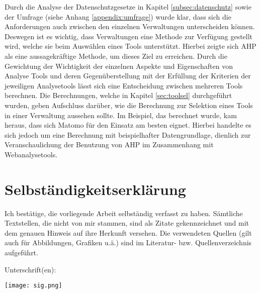Durch die Analyse der Datenschutzgesetze in Kapitel \ref{subsec:datenschutz} sowie der Umfrage (siehe Anhang \ref{appendix:umfrage}) wurde klar, dass sich die Anforderungen auch zwischen den einzelnen Verwaltungen unterscheiden können. Deswegen ist es wichtig, dass Verwaltungen eine Methode zur Verfügung gestellt wird, welche sie beim Auswählen eines Tools unterstützt. Hierbei zeigte sich AHP als eine aussagekräftige Methode, um dieses Ziel zu erreichen. Durch die Gewichtung der Wichtigkeit der einzelnen Aspekte und Eigenschaften von Analyse Tools und deren Gegenüberstellung mit der Erfüllung der Kriterien der jeweiligen Analysetools lässt sich eine Entscheidung zwischen mehreren Tools berechnen. Die Berechnungen, welche in Kapitel \ref{sec:toolsel} durchgeführt wurden, geben Aufschluss darüber, wie die Berechnung zur Selektion eines Tools in einer Verwaltung aussehen sollte. Im Beispiel, das berechnet wurde, kam heraus, dass sich Matomo für den Einsatz am besten eignet. Hierbei handelte es sich jedoch um eine Berechnung mit beispielhafter Datengrundlage, dienlich zur Veranschaulichung der Benutzung von AHP im Zusammenhang mit Webanalysetools. 

\newpage

\section{Selbständigkeitserklärung}

Ich bestätige, die vorliegende Arbeit selbständig verfasst zu haben. Sämtliche Textstellen, die nicht von mir stammen, sind als Zitate gekennzeichnet und mit dem genauen Hinweis auf ihre Herkunft versehen. Die verwendeten Quellen (gilt auch für Abbildungen, Grafiken u.ä.) sind im Literatur- bzw. Quellenverzeichnis aufgeführt.



Unterschrift(en):

\texttt{[image: sig.png]}